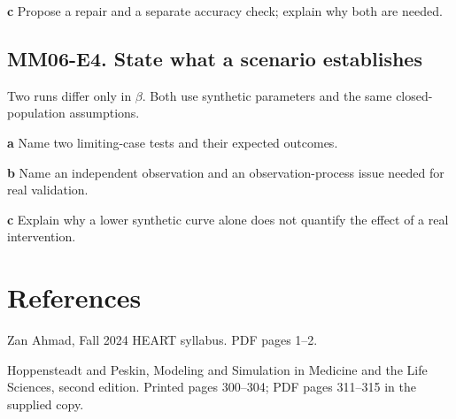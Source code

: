 \documentclass[11pt,letterpaper]{article}
\theoremstyle{definition}\newtheorem{definition}{Definition}\newtheorem{example}{Example}
\numberwithin{equation}{section}
\begin{document}
\textbf{c} Propose a repair and a separate accuracy check; explain why both are needed.

\par\noindent\begin{minipage}{\linewidth}
\subsection*{MM06-E4. State what a scenario establishes}
Two runs differ only in $\beta$. Both use synthetic parameters and the same closed-population assumptions.

\textbf{a} Name two limiting-case tests and their expected outcomes.

\end{minipage}\par\medskip
\textbf{b} Name an independent observation and an observation-process issue needed for real validation.

\textbf{c} Explain why a lower synthetic curve alone does not quantify the effect of a real intervention.

\section*{References}
\noindent\begin{minipage}{\linewidth}
Zan Ahmad, Fall 2024 HEART syllabus. PDF pages 1--2.

\end{minipage}\par\medskip
\noindent\begin{minipage}{\linewidth}
Hoppensteadt and Peskin, Modeling and Simulation in Medicine and the Life Sciences, second edition. Printed pages 300--304; PDF pages 311--315 in the supplied copy.

\end{minipage}\par\medskip
\end{document}
